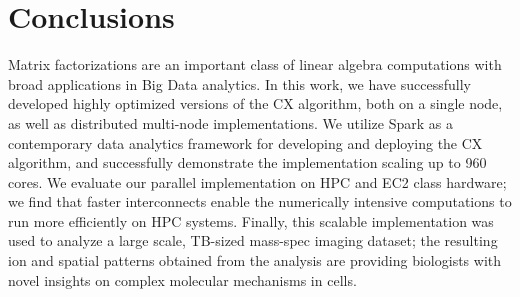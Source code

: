 \section{Conclusions}
\label{sec:conclusion}

Matrix factorizations are an important class of linear algebra computations
with broad applications in Big Data analytics. In this work, we have
successfully developed highly optimized versions of the CX algorithm, both on a
single node, as well as distributed multi-node implementations. We utilize
Spark as a contemporary data analytics framework for developing and deploying
the CX algorithm, and successfully demonstrate the implementation scaling up to
960 cores. We evaluate our parallel implementation on HPC and EC2 class
hardware; we find that faster interconnects enable the numerically intensive
computations to run more efficiently on HPC systems. Finally, this scalable
implementation was used to analyze a large scale, TB-sized mass-spec imaging
dataset; the resulting ion and spatial patterns obtained from the analysis are
providing biologists with novel insights on complex molecular mechanisms in
cells. 

